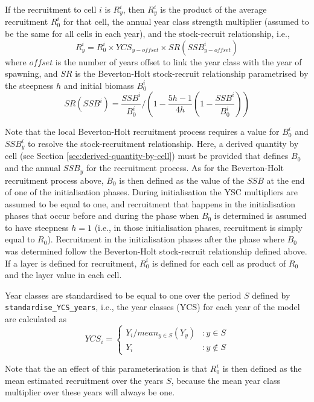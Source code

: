 If the recruitment to cell $i$ is $R_y^i$, then $R_y^i$ is the product of the average recruitment $R_0^i$ for that cell, the annual year class strength multiplier (assumed to be the same for all cells in each year), and the stock-recruit relationship, i.e., 
\begin{equation}
  R_y^i = R_0^i \times YCS_{y-offset} \times SR(SSB_{y-offset}^i)
\end{equation}
where $offset$ is the number of years offset to link the year class with the year of spawning, and $SR$ is the Beverton-Holt stock-recruit relationship parametrised by the steepness $h$ and initial biomass $B_0^i$
\begin{equation}
SR(SSB^i) = \frac{SSB^i}{B_0^i} / \left( 1-\frac{5h-1}{4h} \left( 1-\frac{SSB^i}{B_0^i} \right) \right)
\end{equation}

Note that the local Beverton-Holt recruitment process requires a value for $B_0^i$ and $SSB_y^i$ to resolve the stock-recruitment relationship. Here, a derived quantity by cell (see Section \ref{sec:derived-quantity-by-cell}) must be provided that defines $B_0$ and the annual $SSB_y$ for the recruitment process. As for the Beverton-Holt recruitment process above, $B_0$ is then defined as the value of the $SSB$ at the end of one of the initialisation phases. During initialisation the YSC multipliers are assumed to be equal to one, and recruitment that happens in the initialisation phases that occur before and during the phase when $B_0$ is determined is assumed to have steepness $h=1$ (i.e., in those initialisation phases, recruitment is simply equal to $R_0$). Recruitment in the initialisation phases after the phase where $B_0$ was determined follow the Beverton-Holt stock-recruit relationship defined above. If a layer is defined for recruitment, $R_0^i$ is defined for each cell as product of $R_0$ and the layer value in each cell. 

Year classes are standardised to be equal to one over the period $S$ defined by \texttt{standardise\_YCS\_years}, i.e., the year classes (YCS) for each year of the model are calculated as 
\begin{equation}
  YCS_i = \left\{
	   \begin{array}{ll}
     Y_i / mean_{y \in S}(Y_y) & : y \in S \\
	   Y_i & : y \notin S
  \end{array}
  \right.
\end{equation}

Note that the an effect of this parameterisation is that $R_0^i$ is then defined as the mean estimated recruitment over the years $S$, because the mean year class multiplier over these years will always be one.

